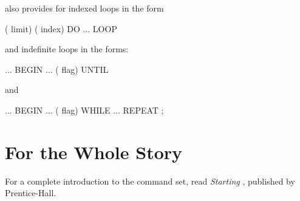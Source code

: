 \Forth{} also provides for indexed loops in the form
\begin{Code}
( limit) ( index) DO ... LOOP
\end{Code}
and indefinite loops in the forms:
\begin{Code}
... BEGIN  ...  ( flag) UNTIL
\end{Code}
and
\begin{Code}
... BEGIN  ...  ( flag) WHILE ... REPEAT ;
\end{Code}
\section{For the Whole Story}
For a complete introduction to the \Forth{} command set, read
\emph{Starting \Forth{}}, published by Prentice-Hall.%
%
